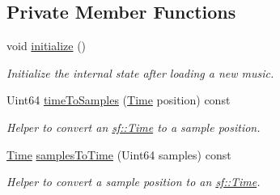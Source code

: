 \subsection*{Private Member Functions}
\begin{DoxyCompactItemize}
\item 
void \mbox{\hyperlink{classsf_1_1_music_a5da7929d371fda9bb5fdbb0ee0fdce5f}{initialize}} ()
\begin{DoxyCompactList}\small\item\em Initialize the internal state after loading a new music. \end{DoxyCompactList}\item 
Uint64 \mbox{\hyperlink{classsf_1_1_music_a172e5bfd83235c471c96004f93c4bd0d}{time\+To\+Samples}} (\mbox{\hyperlink{classsf_1_1_time}{Time}} position) const
\begin{DoxyCompactList}\small\item\em Helper to convert an \mbox{\hyperlink{classsf_1_1_time}{sf\+::\+Time}} to a sample position. \end{DoxyCompactList}\item 
\mbox{\hyperlink{classsf_1_1_time}{Time}} \mbox{\hyperlink{classsf_1_1_music_aa6e80347f64dde5dcd4a260e42358ac5}{samples\+To\+Time}} (Uint64 samples) const
\begin{DoxyCompactList}\small\item\em Helper to convert a sample position to an \mbox{\hyperlink{classsf_1_1_time}{sf\+::\+Time}}. \end{DoxyCompactList}\end{DoxyCompactItemize}
